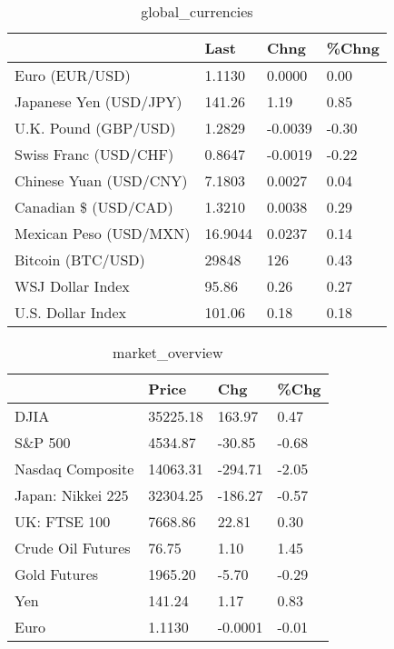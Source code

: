 \documentclass{article}%
\begin{document}
%


\begin{table}[htbp]%
\caption{global\_currencies}%
\centering%
\begin{adjustbox}{width=1\textwidth}%
\begin{tabular}{llll}
\toprule
                       &    Last &    Chng & \%Chng \\
\midrule
        Euro (EUR/USD) &  1.1130 &  0.0000 &  0.00 \\
Japanese Yen (USD/JPY) &  141.26 &    1.19 &  0.85 \\
  U.K. Pound (GBP/USD) &  1.2829 & -0.0039 & -0.30 \\
 Swiss Franc (USD/CHF) &  0.8647 & -0.0019 & -0.22 \\
Chinese Yuan (USD/CNY) &  7.1803 &  0.0027 &  0.04 \\
  Canadian \$ (USD/CAD) &  1.3210 &  0.0038 &  0.29 \\
Mexican Peso (USD/MXN) & 16.9044 &  0.0237 &  0.14 \\
     Bitcoin (BTC/USD) &   29848 &     126 &  0.43 \\
      WSJ Dollar Index &   95.86 &    0.26 &  0.27 \\
     U.S. Dollar Index &  101.06 &    0.18 &  0.18 \\
\bottomrule
\end{tabular}
%
\end{adjustbox}%
\end{table}

%


\begin{table}[htbp]%
\caption{market\_overview}%
\centering%
\begin{adjustbox}{width=1\textwidth}%
\begin{tabular}{llll}
\toprule
                  &    Price &     Chg &  \%Chg \\
\midrule
             DJIA & 35225.18 &  163.97 &  0.47 \\
          S\&P 500 &  4534.87 &  -30.85 & -0.68 \\
 Nasdaq Composite & 14063.31 & -294.71 & -2.05 \\
Japan: Nikkei 225 & 32304.25 & -186.27 & -0.57 \\
     UK: FTSE 100 &  7668.86 &   22.81 &  0.30 \\
Crude Oil Futures &    76.75 &    1.10 &  1.45 \\
     Gold Futures &  1965.20 &   -5.70 & -0.29 \\
              Yen &   141.24 &    1.17 &  0.83 \\
             Euro &   1.1130 & -0.0001 & -0.01 \\
\bottomrule
\end{tabular}
%
\end{adjustbox}%
\end{table}

%
\end{document}
